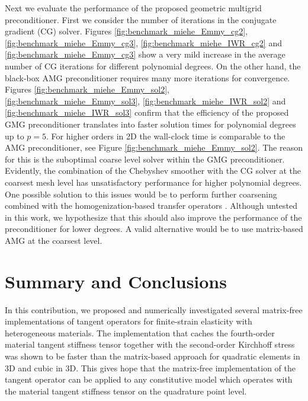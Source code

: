 \documentclass[preprint,12pt,times]{elsarticle}
\begin{document}
Next we evaluate the performance of the proposed geometric multigrid preconditioner.
First we consider the number of iterations in the conjugate gradient (CG) solver.
Figures \ref{fig:benchmark_miehe_Emmy_cg2}, \ref{fig:benchmark_miehe_Emmy_cg3}, \ref{fig:benchmark_miehe_IWR_cg2} and \ref{fig:benchmark_miehe_Emmy_cg3} show a very mild increase in the average number of CG iterations for different polynomial degrees.
On the other hand, the black-box AMG preconditioner requires many more iterations for convergence.
Figures \ref{fig:benchmark_miehe_Emmy_sol2}, \ref{fig:benchmark_miehe_Emmy_sol3}, \ref{fig:benchmark_miehe_IWR_sol2} and \ref{fig:benchmark_miehe_IWR_sol3} confirm that the efficiency of the proposed GMG preconditioner translates into faster solution times for polynomial degrees up to $p=5$.
For higher orders in 2D the wall-clock time is comparable to the AMG preconditioner, see Figure \ref{fig:benchmark_miehe_Emmy_sol2}.
The reason for this is the suboptimal coarse level solver within the GMG preconditioner.
Evidently, the combination of the Chebyshev smoother with the CG solver at the coarsest mesh level has unsatisfactory performance for higher polynomial degrees.
One possible solution to this issues would be to perform further coarsening combined with the homogenization-based transfer operators \cite{Miehe2007}.
Although untested in this work, we hypothesize that this should also improve the performance of the preconditioner for lower degrees.
A valid alternative would be to use matrix-based AMG at the coarsest level.

\section{Summary and Conclusions}
\label{sec:summary}

In this contribution, we proposed and numerically investigated several matrix-free implementations of tangent operators for finite-strain elasticity with heterogeneous materials.
The implementation that caches the fourth-order material tangent {\color{red}stiffness tensor} together with the second-order Kirchhoff stress was shown to be faster than the matrix-based approach for quadratic elements in 3D and cubic in 3D.
This gives hope that the matrix-free implementation of the tangent operator can be applied to any constitutive model which operates with the material tangent {\color{red}stiffness tensor} on the quadrature point level.
\end{document}

